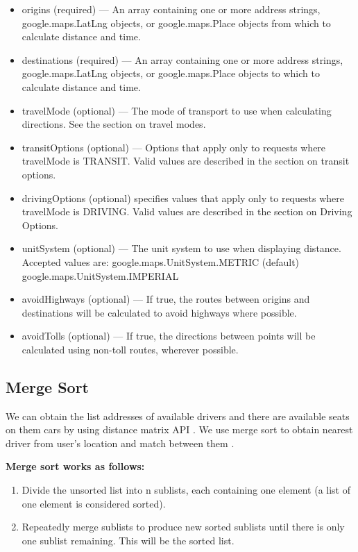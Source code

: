 \begin{itemize}
    \item origins (required) — An array containing one or more address strings, google.maps.LatLng objects, or google.maps.Place objects from which to calculate distance and time.
    \item destinations (required) — An array containing one or more address strings, google.maps.LatLng objects, or google.maps.Place objects to which to calculate distance and time.
    \item travelMode (optional) — The mode of transport to use when calculating directions. See the section on travel modes.
    \item  transitOptions (optional) — Options that apply only to requests where travelMode is TRANSIT. Valid values are described in the section on transit options.
    \item drivingOptions (optional) specifies values that apply only to requests where travelMode is DRIVING. Valid values are described in the section on Driving Options.
    \item unitSystem (optional) — The unit system to use when displaying distance. Accepted values are:
    google.maps.UnitSystem.METRIC (default)
    google.maps.UnitSystem.IMPERIAL
    \item avoidHighways (optional) — If true, the routes between origins and destinations will be calculated to avoid highways where possible.
    \item avoidTolls (optional) — If true, the directions between points will be calculated using non-toll routes, wherever possible.\cite{am005}
\end{itemize}

\subsection{Merge Sort}
\hspace{2cm} We can obtain the list addresses of available drivers and there are available seats on them cars by using distance matrix API . We use merge sort to obtain nearest driver from user's location and match between them .

\textbf{Merge sort works as follows: }
\begin{enumerate}
     \item Divide the unsorted list into n sublists, each containing one element (a list of one element is considered sorted).
    \item Repeatedly merge sublists to produce new sorted sublists until there is only one sublist remaining. This will be the sorted list.
\end{enumerate}

